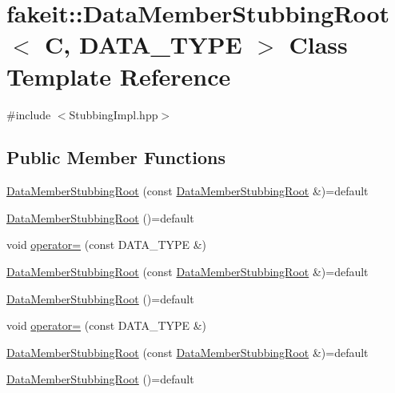 \hypertarget{classfakeit_1_1DataMemberStubbingRoot}{}\section{fakeit\+::Data\+Member\+Stubbing\+Root$<$ C, D\+A\+T\+A\+\_\+\+T\+Y\+PE $>$ Class Template Reference}
\label{classfakeit_1_1DataMemberStubbingRoot}


{\ttfamily \#include $<$Stubbing\+Impl.\+hpp$>$}

\subsection*{Public Member Functions}
\begin{DoxyCompactItemize}
\item 
\mbox{\hyperlink{classfakeit_1_1DataMemberStubbingRoot_a55cf882f6905323f1d5f227bafce29a3}{Data\+Member\+Stubbing\+Root}} (const \mbox{\hyperlink{classfakeit_1_1DataMemberStubbingRoot}{Data\+Member\+Stubbing\+Root}} \&)=default
\item 
\mbox{\hyperlink{classfakeit_1_1DataMemberStubbingRoot_aa412dfee88ec661b0db74915cbfc96ca}{Data\+Member\+Stubbing\+Root}} ()=default
\item 
void \mbox{\hyperlink{classfakeit_1_1DataMemberStubbingRoot_a9658c86eff24d9703cda9318c0c59001}{operator=}} (const D\+A\+T\+A\+\_\+\+T\+Y\+PE \&)
\item 
\mbox{\hyperlink{classfakeit_1_1DataMemberStubbingRoot_a55cf882f6905323f1d5f227bafce29a3}{Data\+Member\+Stubbing\+Root}} (const \mbox{\hyperlink{classfakeit_1_1DataMemberStubbingRoot}{Data\+Member\+Stubbing\+Root}} \&)=default
\item 
\mbox{\hyperlink{classfakeit_1_1DataMemberStubbingRoot_aa412dfee88ec661b0db74915cbfc96ca}{Data\+Member\+Stubbing\+Root}} ()=default
\item 
void \mbox{\hyperlink{classfakeit_1_1DataMemberStubbingRoot_a9658c86eff24d9703cda9318c0c59001}{operator=}} (const D\+A\+T\+A\+\_\+\+T\+Y\+PE \&)
\item 
\mbox{\hyperlink{classfakeit_1_1DataMemberStubbingRoot_a55cf882f6905323f1d5f227bafce29a3}{Data\+Member\+Stubbing\+Root}} (const \mbox{\hyperlink{classfakeit_1_1DataMemberStubbingRoot}{Data\+Member\+Stubbing\+Root}} \&)=default
\item 
\mbox{\hyperlink{classfakeit_1_1DataMemberStubbingRoot_aa412dfee88ec661b0db74915cbfc96ca}{Data\+Member\+Stubbing\+Root}} ()=default

\end{DoxyCompactItemize}
